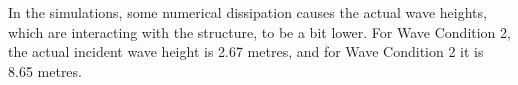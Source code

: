 In the simulations, some numerical dissipation causes the actual wave heights, which are interacting with the structure, to be a bit lower. For Wave Condition 2, the actual incident wave height is 2.67 metres, and for Wave Condition 2 it is 8.65 metres.












